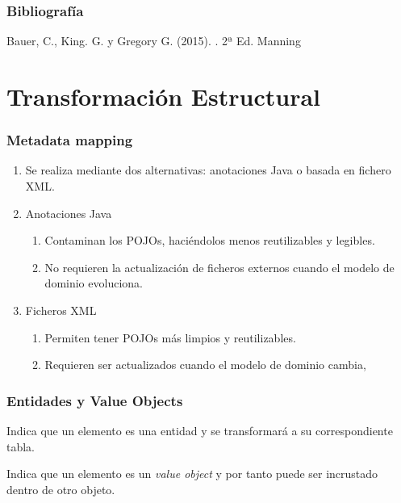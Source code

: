 \documentclass[a4paper,slidestop,xcolor=pst,blue]{beamer}
\begin{document}
\begin{frame}[c]
    \frametitle{Bibliografía}
    \begin{thebibliography}{1}

        Bauer, C., King. G. y Gregory G. (2015).
        . 2ª Ed.
        \newblock Manning


    \end{thebibliography}
\end{frame}

\section{Transformación Estructural}

\begin{frame}[c]
    \frametitle{Metadata mapping}
    \begin{enumerate}[<+->]
         \item<1-> Se realiza mediante dos alternativas: anotaciones Java o basada en fichero XML.
         \item<2-> Anotaciones Java
             \begin{enumerate}
                \item<3-> Contaminan los POJOs, haciéndolos menos reutilizables y legibles.
                \item<4-> No requieren la actualización de ficheros externos cuando el modelo de dominio evoluciona.
             \end{enumerate}
         \item<5-> Ficheros XML
             \begin{enumerate}
                \item<6-> Permiten tener POJOs más limpios y reutilizables.
                \item<7-> Requieren ser actualizados cuando el modelo de dominio cambia,
             \end{enumerate}
    \end{enumerate}
\end{frame}

\begin{frame}[c]
    \frametitle{Entidades y Value Objects}
    \begin{description}[<+->]
        \item[@Entity] Indica que un elemento es una entidad y se transformará a su correspondiente tabla.
        \item[@Embeddable] Indica que un elemento es un \emph{value object} y por tanto puede ser incrustado dentro de otro objeto.
    \end{description}
\end{frame}
\end{document}
